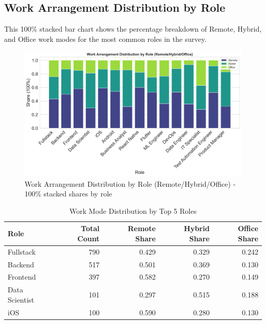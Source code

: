 \documentclass[12pt,a4paper]{article}
\begin{document}
\subsection{Work Arrangement Distribution by Role}
This 100\% stacked bar chart shows the percentage breakdown of Remote, Hybrid, and Office work modes for the most common roles in the survey.

\begin{figure}[H]
	\centering
	\includegraphics[width=\textwidth]{figures/barplot_work_arrangement_by_role.png}
	\caption{Work Arrangement Distribution by Role (Remote/Hybrid/Office) - 100\% stacked shares by role}
\end{figure}

\begin{table}[H]
	\centering
	\small
	\begin{tabular}{lrrrr}
		\toprule
		\textbf{Role}  & \textbf{Total Count} & \textbf{Remote Share} & \textbf{Hybrid Share} & \textbf{Office Share} \\
		\midrule
		Fullstack      & 790                  & 0.429                 & 0.329                 & 0.242                 \\
		Backend        & 517                  & 0.501                 & 0.369                 & 0.130                 \\
		Frontend       & 397                  & 0.582                 & 0.270                 & 0.149                 \\
		Data Scientist & 101                  & 0.297                 & 0.515                 & 0.188                 \\
		iOS            & 100                  & 0.590                 & 0.280                 & 0.130                 \\
		\bottomrule
	\end{tabular}
	\caption{Work Mode Distribution by Top 5 Roles}
\end{table}
\end{document}
